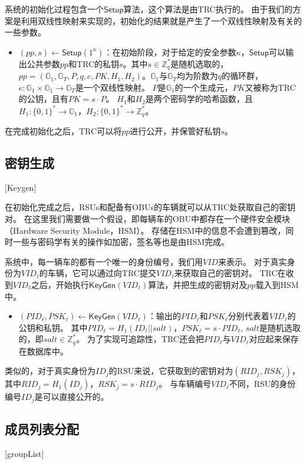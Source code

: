 系统的初始化过程包含一个$\mathsf{Setup}$算法，这个算法是由TRC执行的。
由于我们的方案是利用双线性映射来实现的，初始化的结果就是产生了一个双线性映射及有关的一些参数。
\begin{itemize}
  \item $(pp,s)\leftarrow\mathsf{Setup}(1^\kappa)$：在初始阶段，对于给定的安全参数$\kappa$，$\mathsf{Setup}$可以输出公共参数$pp$和TRC的私钥$s$。其中$s\in\mathbb{Z}^*_q$是随机选取的，$pp=(\mathbb{G}_1,\mathbb{G}_T,P,q,e,PK,H_1,H_2)$。$\mathbb{G}_1$与$\mathbb{G}_T$均为阶数为$q$的循环群，$e:\mathbb{G}_1\times\mathbb{G}_1\rightarrow\mathbb{G}_T$是一个双线性映射。
$P$是$\mathbb{G}_1$的一个生成元，$PK$又被称为TRC的公钥，且有$PK=s\cdot P$。
$H_1$和$H_2$是两个密码学的哈希函数，且$H_1:\{0,1\}^*\rightarrow\mathbb{G}_1$，$H_2:\{0,1\}^*\rightarrow\mathbb{Z}_q^*$。
\end{itemize}

在完成初始化之后，TRC可以将$pp$进行公开，并保管好私钥$s$。

\subsection{密钥生成}[Keygen]

在初始化完成之后，RSUs和配备有OBUs的车辆就可以从TRC处获取自己的密钥对。
在这里我们需要做一个假设，即每辆车的OBU中都存在一个硬件安全模块（Hardware Security Module，HSM）\cite{tzeng2017enhancing}。
存储在HSM中的信息不会遭到篡改，同时一些与密码学有关的操作如加密，签名等也是由HSM完成。

系统中，每一辆车的都有一个唯一的身份编号，我们用$VID$来表示。
对于真实身份为$VID_\ell$的车辆，它可以通过向TRC提交$VID_\ell$来获取自己的密钥对。
TRC在收到$VID_\ell$之后，开始执行$\mathsf{KeyGen}(VID_\ell)$算法，并把生成的密钥对及$pp$载入到HSM中。

\begin{itemize}
  \item $(PID_\ell,PSK_\ell)\leftarrow\mathsf{KeyGen}(VID_\ell)$：输出的$PID_\ell$和$PSK_\ell$分别代表着$VID_\ell$的公钥和私钥。
  其中$PID_\ell=H_1(ID_\ell||salt)$，$PSK_\ell=s\cdot PID_\ell$, $salt$是随机选取的，即$salt\in\mathbb{Z}_q^*$。
  为了实现可追踪性，TRC还会把$PID_\ell$与$VID_\ell$对应起来保存在数据库中。
\end{itemize}

类似的，对于真实身份为$ID_j$的RSU来说，它获取到的密钥对为$(RID_j,RSK_j)$，其中$RID_j=H_1(ID_j)$，$RSK_j=s\cdot RID_j$。
与车辆编号$VID_\ell$不同，RSU的身份编号$ID_j$是可以直接公开的。

\subsection{成员列表分配}[groupList]

